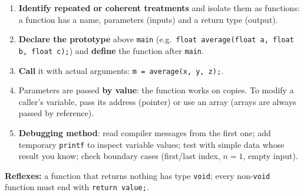 \documentclass[11pt]{article}
\begin{document}
\begin{methode}
\begin{enumerate}
\item \textbf{Identify repeated or coherent treatments} and isolate them as functions: a function has a name, parameters (inputs) and a return type (output).
\item \textbf{Declare the prototype} above \texttt{main} (e.g.\ \texttt{float average(float a, float b, float c);}) and \textbf{define} the function after \texttt{main}.
\item \textbf{Call} it with actual arguments: \texttt{m = average(x, y, z);}.
\item Parameters are passed \textbf{by value}: the function works on copies. To modify a caller's variable, pass its address (pointer) or use an array (arrays are always passed by reference).
\item \textbf{Debugging method}: read compiler messages from the first one; add temporary \texttt{printf} to inspect variable values; test with simple data whose result you know; check boundary cases (first/last index, $n = 1$, empty input).
\end{enumerate}
\textbf{Reflexes:} a function that returns nothing has type \texttt{void}; every non-\texttt{void} function must end with \texttt{return value;}.
\end{methode}
\end{document}
